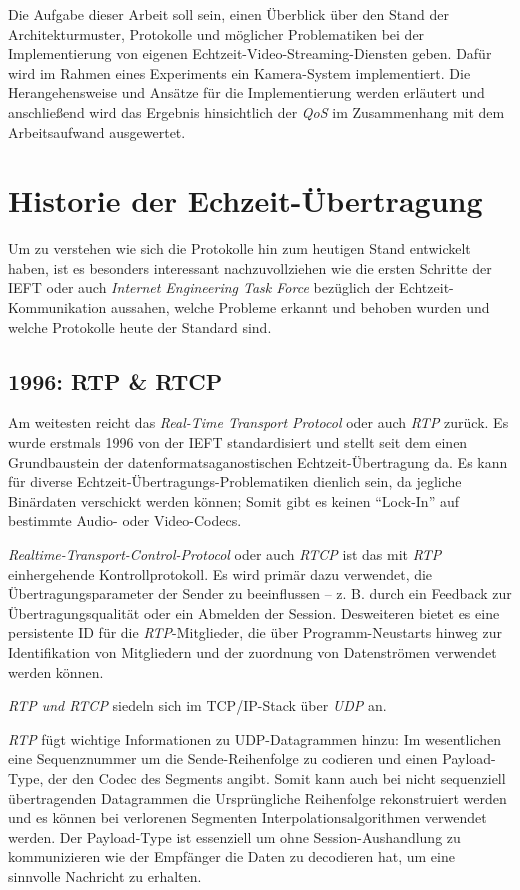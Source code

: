 \documentclass{article}
\begin{document}
\begin{onecolumn}
Die Aufgabe dieser Arbeit soll sein, einen Überblick über den Stand der
Architekturmuster, Protokolle und möglicher Problematiken bei der
Implementierung von eigenen Echtzeit-Video-Streaming-Diensten geben. Dafür wird
im Rahmen eines Experiments ein Kamera-System implementiert. Die
Herangehensweise und Ansätze für die Implementierung werden erläutert und
anschließend wird das Ergebnis hinsichtlich der \textit{QoS} im Zusammenhang
mit dem Arbeitsaufwand ausgewertet.

\section{Historie der Echzeit-Übertragung}

Um zu verstehen wie sich die Protokolle hin zum heutigen Stand entwickelt
haben, ist es besonders interessant nachzuvollziehen wie die ersten Schritte
der IEFT oder auch \textit{Internet Engineering Task Force} bezüglich der
Echtzeit-Kommunikation aussahen, welche Probleme erkannt und behoben wurden und
welche Protokolle heute der Standard sind.

\subsection{1996: RTP \& RTCP}

Am weitesten reicht das \textit{Real-Time Transport Protocol} oder auch
\textit{RTP} zurück. Es wurde erstmals 1996 von der IEFT standardisiert und
stellt seit dem einen Grundbaustein der datenformatsaganostischen
Echtzeit-Übertragung da. Es kann für diverse
Echtzeit-Übertragungs-Problematiken dienlich sein, da jegliche Binärdaten
verschickt werden können; Somit gibt es keinen ``Lock-In'' auf bestimmte Audio-
oder Video-Codecs.

\textit{Realtime-Transport-Control-Protocol} oder auch \textit{RTCP} ist das
mit \textit{RTP} einhergehende Kontrollprotokoll. Es wird primär dazu
verwendet, die Übertragungsparameter der Sender zu beeinflussen – z. B. durch
ein Feedback zur Übertragungsqualität oder ein Abmelden der Session.
Desweiteren bietet es eine persistente ID für die \textit{RTP}-Mitglieder, die
über Programm-Neustarts hinweg zur Identifikation von Mitgliedern und der
zuordnung von Datenströmen verwendet werden können.~\cite{RFC1889}

\textit{RTP und RTCP} siedeln sich im TCP/IP-Stack über \textit{UDP}
an.~\cite{RFC1889}

\textit{RTP} fügt wichtige Informationen zu UDP-Datagrammen hinzu: Im
wesentlichen eine Sequenznummer um die Sende-Reihenfolge zu codieren und einen
Payload-Type, der den Codec des Segments angibt. Somit kann auch bei nicht
sequenziell übertragenden Datagrammen die Ursprüngliche Reihenfolge
rekonstruiert werden und es können bei verlorenen Segmenten
Interpolationsalgorithmen verwendet werden. Der Payload-Type ist essenziell um
ohne Session-Aushandlung zu kommunizieren wie der Empfänger die Daten zu
decodieren hat, um eine sinnvolle Nachricht zu erhalten.


\end{onecolumn}
\end{document}
